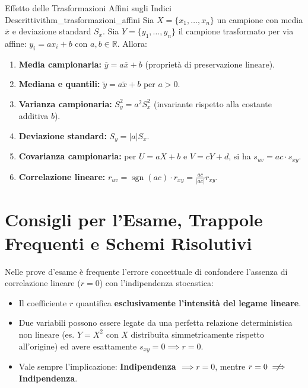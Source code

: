 \begin{teorema}{Effetto delle Trasformazioni Affini sugli Indici Descrittivi}{thm_trasformazioni_affini}
Sia $X = \{x_1, \dots, x_n\}$ un campione con media $\overline{x}$ e deviazione standard $S_x$. Sia $Y = \{y_1, \dots, y_n\}$ il campione trasformato per via affine: $y_i = a x_i + b$ con $a, b \in \mathbb{R}$. Allora:
\begin{enumerate}
    \item \textbf{Media campionaria:} $\overline{y} = a\overline{x} + b$ (proprietà di preservazione lineare).
    \item \textbf{Mediana e quantili:} $\widetilde{y} = a\widetilde{x} + b$ per $a > 0$.
    \item \textbf{Varianza campionaria:} $S_y^2 = a^2 S_x^2$ (invariante rispetto alla costante additiva $b$).
    \item \textbf{Deviazione standard:} $S_y = |a| S_x$.
    \item \textbf{Covarianza campionaria:} per $U = aX + b$ e $V = cY + d$, si ha $s_{uv} = ac \cdot s_{xy}$.
    \item \textbf{Correlazione lineare:} $r_{uv} = \operatorname{sgn}(ac) \cdot r_{xy} = \frac{ac}{|ac|} r_{xy}$.
\end{enumerate}
\end{teorema}

\section{Consigli per l'Esame, Trappole Frequenti e Schemi Risolutivi}
\label{sec:consigli_esame_cap1}

\begin{esame}[Trappola 1: Incorrelazione Lineare ($r=0$) vs Indipendenza]
Nelle prove d'esame è frequente l'errore concettuale di confondere l'assenza di correlazione lineare ($r = 0$) con l'indipendenza stocastica:
\begin{itemize}
    \item Il coefficiente $r$ quantifica \textbf{esclusivamente l'intensità del legame lineare}.
    \item Due variabili possono essere legate da una perfetta relazione deterministica non lineare (es. $Y = X^2$ con $X$ distribuita simmetricamente rispetto all'origine) ed avere esattamente $s_{xy} = 0 \implies r = 0$.
    \item Vale sempre l'implicazione: \textbf{Indipendenza $\implies r = 0$}, mentre \textbf{$r = 0 \centernot\implies$ Indipendenza}.
\end{itemize}
\end{esame}

